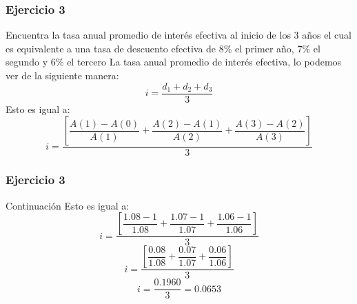 \documentclass[compress]{beamer}
\begin{document}
\begin{frame}\frametitle{Ejercicio 3}
\begin{block}{Encuentra la tasa anual promedio de interés efectiva al inicio de los 3 años el cual es equivalente a una tasa de descuento efectiva de $8\%$ el primer año, $7\%$ el segundo y $6\%$ el tercero}
La tasa anual promedio de interés efectiva, lo podemos ver de la siguiente manera:
$$i= \dfrac{d_{1}+ d_{2}+ d_{3}}{3}$$
Esto es igual a:
$$i= \dfrac{[\dfrac{A(1)-A(0)}{A(1)} + \dfrac{A(2)-A(1)}{A(2)} + \dfrac{A(3)-A(2)}{A(3)}]}{3}$$
\end{block}
\end{frame}
\begin{frame}\frametitle{Ejercicio 3}
\begin{block}{Continuación}
Esto es igual a:
$$i= \dfrac{[\dfrac{1.08-1}{1.08} + \dfrac{1.07-1}{1.07} + \dfrac{1.06-1}{1.06}]}{3}$$
$$i= \dfrac{[\dfrac{0.08}{1.08} + \dfrac{0.07}{1.07} + \dfrac{0.06}{1.06}]}{3}$$
$$i = \dfrac{0.1960}{3} = 0.0653$$
\end{block}
\end{frame} 
\end{document}
